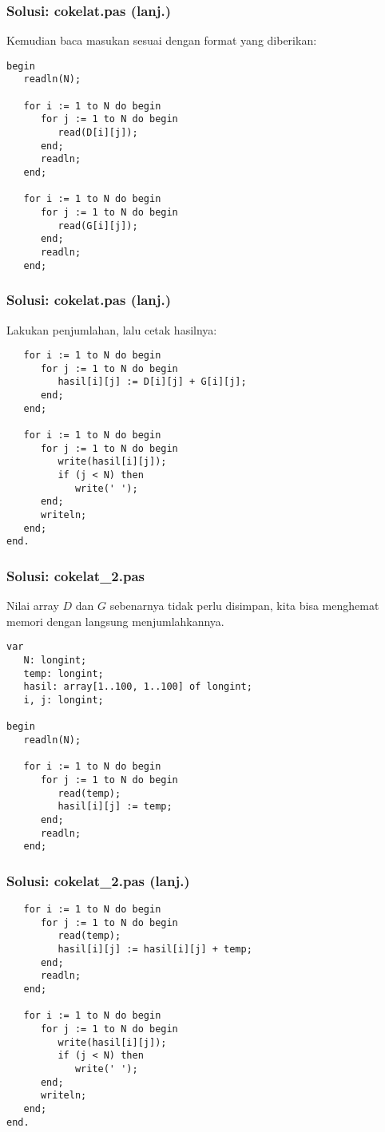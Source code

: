 \documentclass{beamer}
\begin{document}
\begin{frame}[fragile]
\frametitle{Solusi: cokelat.pas (lanj.)}
Kemudian baca masukan sesuai dengan format yang diberikan:
\begin{lstlisting}
begin
   readln(N);
   
   for i := 1 to N do begin
      for j := 1 to N do begin
         read(D[i][j]);
      end;
      readln;
   end;

   for i := 1 to N do begin
      for j := 1 to N do begin
         read(G[i][j]);
      end;
      readln;
   end;
\end{lstlisting}
\end{frame}

\begin{frame}[fragile]
\frametitle{Solusi: cokelat.pas (lanj.)}
Lakukan penjumlahan, lalu cetak hasilnya:
\begin{lstlisting}
   for i := 1 to N do begin
      for j := 1 to N do begin
         hasil[i][j] := D[i][j] + G[i][j];
      end;
   end;   

   for i := 1 to N do begin
      for j := 1 to N do begin
         write(hasil[i][j]);
         if (j < N) then 
            write(' ');
      end;
      writeln;
   end;
end.
\end{lstlisting}
\end{frame}

\begin{frame}[fragile]
\frametitle{Solusi: cokelat\_2.pas}
Nilai array $D$ dan $G$ sebenarnya tidak perlu disimpan, kita bisa menghemat memori dengan langsung menjumlahkannya. 
\begin{lstlisting}
var
   N: longint;
   temp: longint;
   hasil: array[1..100, 1..100] of longint;
   i, j: longint;

begin
   readln(N);
   
   for i := 1 to N do begin
      for j := 1 to N do begin
         read(temp);
         hasil[i][j] := temp;
      end;
      readln;
   end;
\end{lstlisting}
\end{frame}

\begin{frame}[fragile]
\frametitle{Solusi: cokelat\_2.pas (lanj.)}
\begin{lstlisting}
   for i := 1 to N do begin
      for j := 1 to N do begin
         read(temp);
         hasil[i][j] := hasil[i][j] + temp;
      end;
      readln;
   end;

   for i := 1 to N do begin
      for j := 1 to N do begin
         write(hasil[i][j]);
         if (j < N) then 
            write(' ');
      end;
      writeln;
   end;
end.
\end{lstlisting}
\end{frame}
\end{document}
